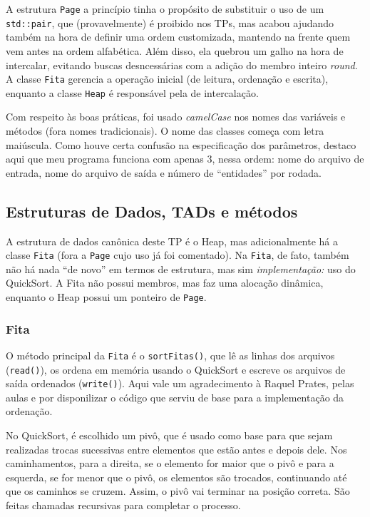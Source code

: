 \documentclass{article}
\def\code#1{\texttt{#1}}
\begin{document}
A estrutura \code{Page} a princípio tinha o propósito de substituir o uso de um \code{std::pair}, que (provavelmente) é proibido nos TPs, mas acabou ajudando também na hora de definir uma ordem customizada, mantendo na frente quem vem antes na ordem alfabética. Além disso, ela quebrou um galho na hora de intercalar, evitando buscas desncessárias com a adição do membro inteiro \textit{round}. A classe \code{Fita} gerencia a operação inicial (de leitura, ordenação e escrita), enquanto a classe \code{Heap} é responsável pela de intercalação.

Com respeito às boas práticas, foi usado \textit{camelCase} nos nomes das variáveis e métodos (fora nomes tradicionais). O nome das classes começa com letra maiúscula. Como houve certa confusão na especificação dos parâmetros, destaco aqui que meu programa funciona com apenas 3, nessa ordem: nome do arquivo de entrada, nome do arquivo de saída e número de ``entidades'' por rodada.

\subsection{Estruturas de Dados, TADs e métodos}

A estrutura de dados canônica deste TP é o Heap, mas adicionalmente há a classe \code{Fita} (fora a \code{Page} cujo uso já foi comentado). Na \code{Fita}, de fato, também não há nada ``de novo'' em termos de estrutura, mas sim \textit{implementação:} uso do QuickSort. A Fita não possui membros, mas faz uma alocação dinâmica, enquanto o Heap possui um ponteiro de \code{Page}.

\subsubsection{Fita}

O método principal da \code{Fita} é o \code{sortFitas()}, que lê as linhas dos arquivos (\code{read()}), os ordena em memória usando o QuickSort e escreve os arquivos de saída ordenados (\code{write()}). Aqui vale um agradecimento à Raquel Prates, pelas aulas e por disponilizar o código que serviu de base para a implementação da ordenação.

No QuickSort, é escolhido um pivô, que é usado como base para que sejam realizadas trocas sucessivas entre elementos que estão antes e depois dele. Nos caminhamentos, para a direita, se o elemento for maior que o pivô e para a esquerda, se for menor que o pivô, os elementos são trocados, continuando até que os caminhos se cruzem. Assim, o pivô vai terminar na posição correta. São feitas chamadas recursivas para completar o processo.
\end{document}
